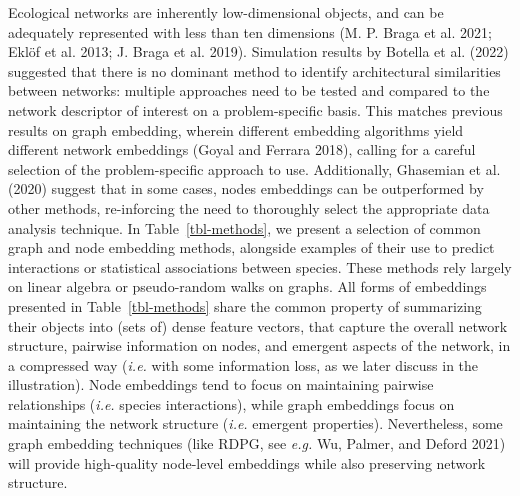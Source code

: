 \documentclass[
  letterpaper,
  DIV=11,
  numbers=noendperiod]{scrartcl}
\begin{document}
Ecological networks are inherently low-dimensional objects, and can be
adequately represented with less than ten dimensions (M. P. Braga et al.
2021; Eklöf et al. 2013; J. Braga et al. 2019). Simulation results by
Botella et al. (2022) suggested that there is no dominant method to
identify architectural similarities between networks: multiple
approaches need to be tested and compared to the network descriptor of
interest on a problem-specific basis. This matches previous results on
graph embedding, wherein different embedding algorithms yield different
network embeddings (Goyal and Ferrara 2018), calling for a careful
selection of the problem-specific approach to use. Additionally,
Ghasemian et al. (2020) suggest that in some cases, nodes embeddings can
be outperformed by other methods, re-inforcing the need to thoroughly
select the appropriate data analysis technique. In
Table~\ref{tbl-methods}, we present a selection of common graph and node
embedding methods, alongside examples of their use to predict
interactions or statistical associations between species. These methods
rely largely on linear algebra or pseudo-random walks on graphs. All
forms of embeddings presented in Table~\ref{tbl-methods} share the
common property of summarizing their objects into (sets of) dense
feature vectors, that capture the overall network structure, pairwise
information on nodes, and emergent aspects of the network, in a
compressed way (\emph{i.e.} with some information loss, as we later
discuss in the illustration). Node embeddings tend to focus on
maintaining pairwise relationships (\emph{i.e.} species interactions),
while graph embeddings focus on maintaining the network structure
(\emph{i.e.} emergent properties). Nevertheless, some graph embedding
techniques (like RDPG, see \emph{e.g.} Wu, Palmer, and Deford 2021) will
provide high-quality node-level embeddings while also preserving network
structure.
\end{document}
